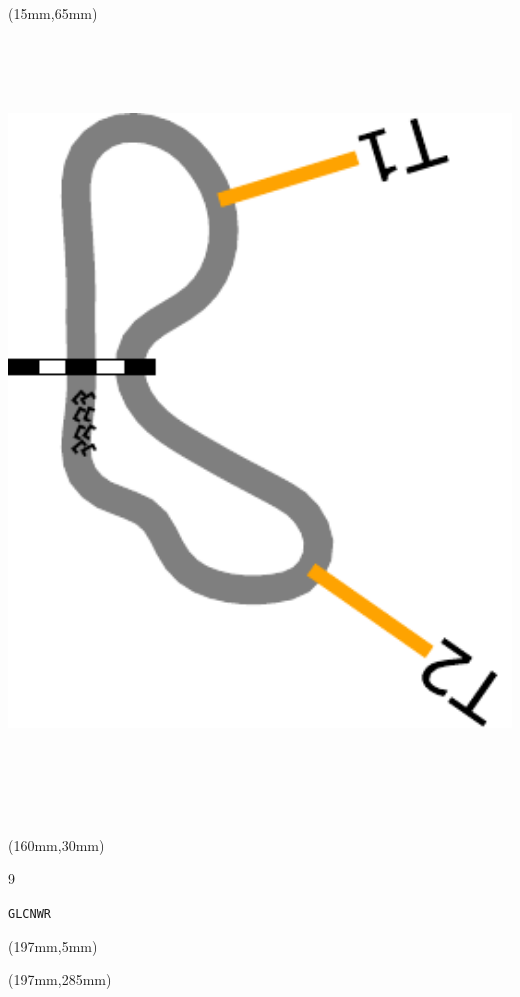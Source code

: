 \begin{textblock*}{185mm}(15mm,65mm)%
\centering
\mbox{\includegraphics[width=185mm,height=210mm,keepaspectratio]{PT/GLCNWR.pdf}}
\end{textblock*}
\begin{textblock*}{40mm}(160mm,30mm)%
\Large
\par{} 
\par9 
\par\hfill\tiny\tt GLCNWR\\
\end{textblock*}
\begin{textblock*}{20mm}(197mm,5mm)%
\fbox{\thepage}
\label{GLCNWR}
\end{textblock*}
\begin{textblock*}{20mm}(197mm,285mm)%
\fbox{\thepage}
\end{textblock*}

